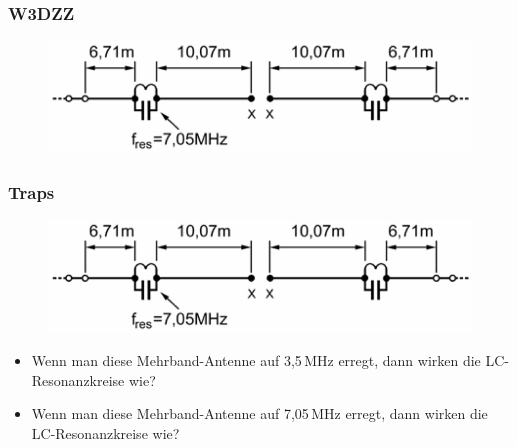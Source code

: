 \begin{frame}
  \frametitle{W3DZZ}
  \begin{center}
    \begin{figure}
      \includegraphics[width=1\textwidth,height=.75\textheight,keepaspectratio]{a09/W3DZZ.png}
    \end{figure}
  \end{center}
\end{frame}

\begin{frame}
  \frametitle{Traps}
  \begin{center}
    \begin{figure}
      \includegraphics[width=1\textwidth,height=.75\textheight,keepaspectratio]{a09/W3DZZ.png}
    \end{figure}
    \begin{itemize}
      \item Wenn man diese Mehrband-Antenne auf 3,5\,MHz erregt, dann wirken die LC-Resonanzkreise wie?
      \item Wenn man diese Mehrband-Antenne auf 7,05\,MHz erregt, dann wirken die LC-Resonanzkreise wie?
    \end{itemize}
  \end{center}
\end{frame}

